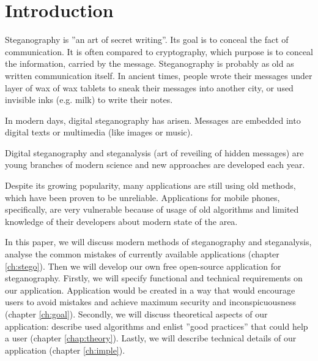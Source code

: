 \chapter*{Introduction}

Steganography is ''an art of secret writing''. Its goal is 
to conceal the fact of communication. It is often compared
to cryptography, which purpose is to conceal the information,
carried by the message. Steganography is probably as old as written
communication itself. In ancient times, people wrote their messages
under layer of wax of wax tablets to sneak their messages into another
city, or used invisible inks (e.g. milk) to write their notes.

In modern days, digital steganography has arisen. Messages are embedded
into digital texts or multimedia (like images or music).

Digital steganography and steganalysis (art of reveiling of hidden messages) 
are young branches of modern science and new approaches are developed each year.

Despite its growing popularity, many applications are still using old methods,
which have been proven to be unreliable. Applications for mobile phones, specifically,
are very vulnerable because of usage of old algorithms and limited knowledge of their
developers about modern state of the area.

In this paper, we will discuss modern methods of steganography and steganalysis, analyse
the common mistakes of currently available applications (chapter \ref{ch:stego}). Then we
will develop our own free open-source application for steganography. Firstly, we will specify
functional and technical requirements on our application. Application would be created in a way
that would encourage users to avoid mistakes and achieve maximum security and inconspicuousness
(chapter \ref{ch:goal}). Secondly, we will discuss theoretical aspects of our application: describe
used algorithms and enlist ''good practices'' that could help a user (chapter \ref{chap:theory}).
Lastly, we will describe technical details of our application (chapter \ref{ch:imple}).
